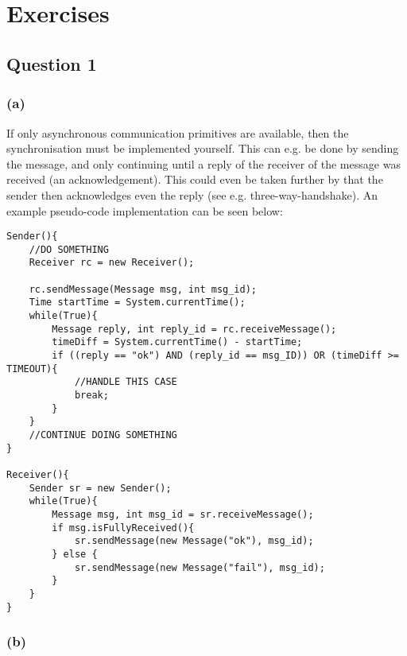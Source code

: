 \documentclass[12pt,a4paper,fleqn]{article}
\begin{document}
\title{\Module\\\Uebung}
\author{\Studentenname}
\maketitle

\section*{Exercises} 
\label{sec:exercises}

\subsection*{Question 1}
\label{sec:eq1}

\subsubsection*{(a)}

If only asynchronous communication primitives are available, then the synchronisation must be implemented yourself. This can e.g. be done by sending the message, and only continuing until a reply of the receiver of the message was received (an acknowledgement). This could even be taken further by that the sender then acknowledges even the reply (see e.g. three-way-handshake). An example pseudo-code implementation can be seen below:

\begin{lstlisting}[basicstyle=\footnotesize,breaklines=true]
Sender(){
	//DO SOMETHING
	Receiver rc = new Receiver();
	
	rc.sendMessage(Message msg, int msg_id);
	Time startTime = System.currentTime();
	while(True){
		Message reply, int reply_id = rc.receiveMessage();
		timeDiff = System.currentTime() - startTime;
		if ((reply == "ok") AND (reply_id == msg_ID)) OR (timeDiff >= TIMEOUT){
			//HANDLE THIS CASE
			break;
		}
	}
	//CONTINUE DOING SOMETHING
}

Receiver(){
	Sender sr = new Sender();
	while(True){
	 	Message msg, int msg_id = sr.receiveMessage();
	 	if msg.isFullyReceived(){
			sr.sendMessage(new Message("ok"), msg_id);
		} else {
			sr.sendMessage(new Message("fail"), msg_id);
		}
	}
}
\end{lstlisting}


\subsubsection*{(b)}
\end{document}
